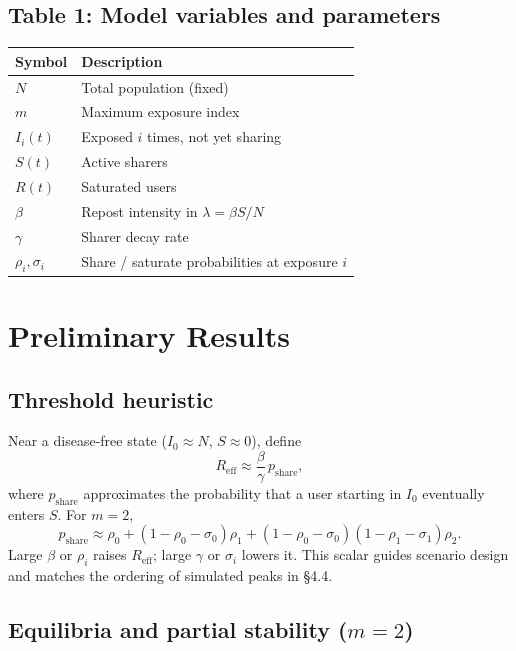 \documentclass[11pt]{article}
\begin{document}
\subsection{Table 1: Model variables and parameters}

\begin{center}
\begin{tabular}{|l|l|}
\hline
\textbf{Symbol} & \textbf{Description} \\
\hline
$N$ & Total population (fixed) \\
$m$ & Maximum exposure index \\
$I_i(t)$ & Exposed $i$ times, not yet sharing \\
$S(t)$ & Active sharers \\
$R(t)$ & Saturated users \\
$\beta$ & Repost intensity in $\lambda=\beta S/N$ \\
$\gamma$ & Sharer decay rate \\
$\rho_i,\sigma_i$ & Share / saturate probabilities at exposure $i$ \\
\hline
\end{tabular}
\end{center}

\section{Preliminary Results}

\subsection{Threshold heuristic}

Near a disease-free state ($I_0\approx N$, $S\approx 0$), define
\begin{equation}
R_{\mathrm{eff}} \approx \frac{\beta}{\gamma}\,p_{\mathrm{share}},
\label{eq:Reff}
\end{equation}
where $p_{\mathrm{share}}$ approximates the probability that a user starting in $I_0$ eventually enters $S$. For $m=2$,
\begin{equation}
p_{\mathrm{share}} \approx \rho_0 + (1-\rho_0-\sigma_0)\rho_1 + (1-\rho_0-\sigma_0)(1-\rho_1-\sigma_1)\rho_2.
\label{eq:pshare}
\end{equation}
Large $\beta$ or $\rho_i$ raises $R_{\mathrm{eff}}$; large $\gamma$ or $\sigma_i$ lowers it. This scalar guides scenario design and matches the ordering of simulated peaks in \S4.4.

\subsection{Equilibria and partial stability ($m=2$)}
\end{document}
